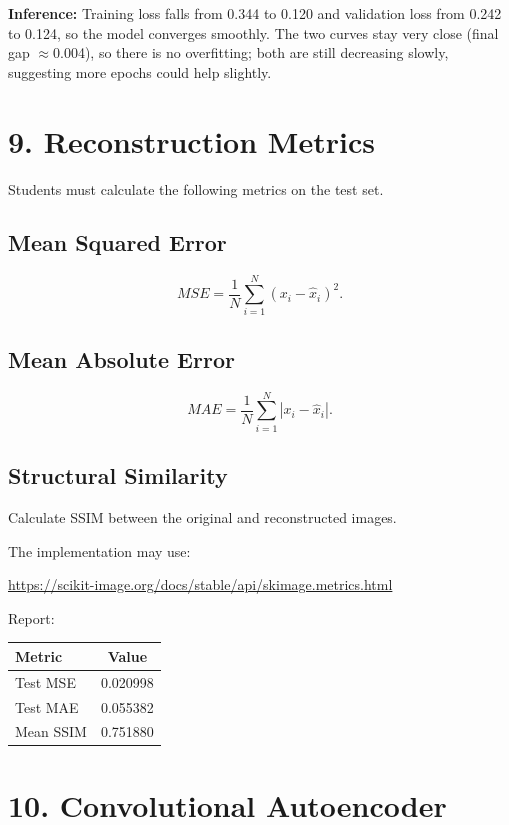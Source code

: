 \documentclass[10pt]{article}
\begin{document}
\textbf{Inference:} Training loss falls from 0.344 to 0.120 and validation loss from 0.242 to 0.124, so the model converges smoothly. The two curves stay very close (final gap $\approx$0.004), so there is no overfitting; both are still decreasing slowly, suggesting more epochs could help slightly.

\section*{9. Reconstruction Metrics}

Students must calculate the following metrics on the test set.

\subsection*{Mean Squared Error}

\[
MSE=
\frac{1}{N}
\sum_{i=1}^{N}
(x_i-\hat{x}_i)^2.
\]

\subsection*{Mean Absolute Error}

\[
MAE=
\frac{1}{N}
\sum_{i=1}^{N}
|x_i-\hat{x}_i|.
\]

\subsection*{Structural Similarity}

Calculate SSIM between the original and reconstructed images.

The implementation may use:

\url{https://scikit-image.org/docs/stable/api/skimage.metrics.html}

Report:

\begin{center}
\begin{tabular}{|l|c|}
\hline
Metric & Value\\
\hline
Test MSE & 0.020998\\
Test MAE & 0.055382\\
Mean SSIM & 0.751880\\
\hline
\end{tabular}
\end{center}

\section*{10. Convolutional Autoencoder}
\end{document}
